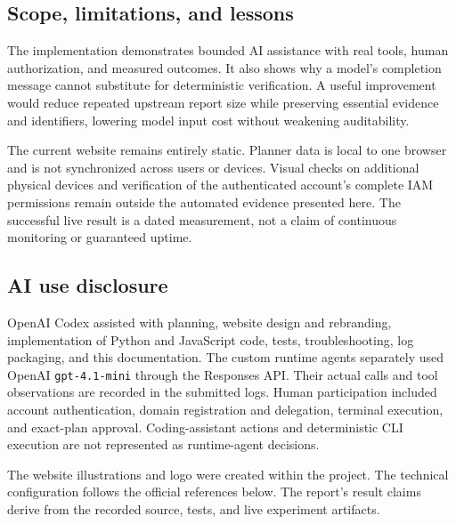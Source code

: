 \documentclass[11pt]{article}
\begin{document}
\subsection{Scope, limitations, and lessons}
The implementation demonstrates bounded AI assistance with real tools, human authorization, and measured outcomes. It also shows why a model's completion message cannot substitute for deterministic verification. A useful improvement would reduce repeated upstream report size while preserving essential evidence and identifiers, lowering model input cost without weakening auditability.

The current website remains entirely static. Planner data is local to one browser and is not synchronized across users or devices. Visual checks on additional physical devices and verification of the authenticated account's complete IAM permissions remain outside the automated evidence presented here. The successful live result is a dated measurement, not a claim of continuous monitoring or guaranteed uptime.

\subsection{AI use disclosure}
OpenAI Codex assisted with planning, website design and rebranding, implementation of Python and JavaScript code, tests, troubleshooting, log packaging, and this documentation. The custom runtime agents separately used OpenAI \texttt{gpt-4.1-mini} through the Responses API. Their actual calls and tool observations are recorded in the submitted logs. Human participation included account authentication, domain registration and delegation, terminal execution, and exact-plan approval. Coding-assistant actions and deterministic CLI execution are not represented as runtime-agent decisions.

The website illustrations and logo were created within the project. The technical configuration follows the official references below. The report's result claims derive from the recorded source, tests, and live experiment artifacts.
\end{document}
